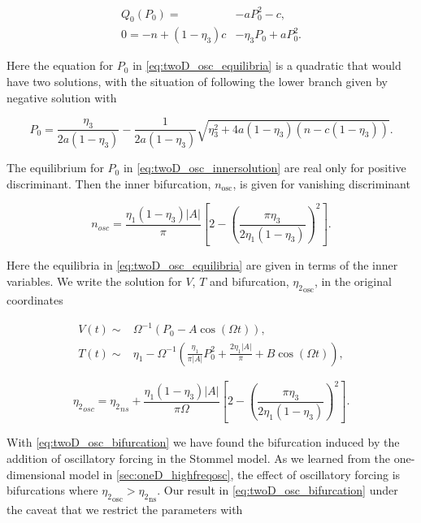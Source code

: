\begin{equation}\label{eq:twoD_osc_equilibria}
\begin{aligned}
Q_0(P_0)=&-aP_0^2-c,\\
0=-n+(1-\eta_3)c&-\eta_3 P_0+aP_0^2.
\end{aligned}
\end{equation}

Here the equation for $P_0$ in \eqref{eq:twoD_osc_equilibria} is a quadratic that would have two solutions, with the situation of following the lower branch given by negative solution with

\begin{equation}\label{eq:twoD_osc_innersolution}
P_0=\frac{\eta_3}{2a(1-\eta_3)}- \frac{1}{2a(1-\eta_3)}\sqrt{\eta_3^2+4a(1-\eta_3)(n-c(1-\eta_3))}.
\end{equation}

The equilibrium for $P_0$ in \eqref{eq:twoD_osc_innersolution} are real only for positive discriminant. Then the inner bifurcation, $n_{\text{osc}}$, is given for vanishing discriminant 

\begin{equation}\label{eq:twoD_osc_innerbif}
n_{osc} = \frac{\eta_1(1-\eta_3)|A|}{\pi}\left[2-\left(\frac{\pi\eta_3}{2\eta_1(1-\eta_3)}\right)^2\right].
\end{equation}

Here the equilibria in \eqref{eq:twoD_osc_equilibria} are given in terms of the inner variables. We write the solution for $V$, $T$ and bifurcation, ${\eta_2}_{\text{osc}}$, in the original coordinates

\begin{equation}\label{eq:twoD_osc_innersolnoriginal}
\begin{aligned}
V(t)\sim& \Omega^{-1}\left(P_0-A\cos(\Omega t)\right),\\
T(t)\sim& \eta_1-\Omega^{-1}\left(\frac{\eta_1}{\pi|A|}P_0^2+\frac{2\eta_1|A|}{\pi}+B\cos(\Omega t)\right),
\end{aligned}
\end{equation}

\begin{equation}\label{eq:twoD_osc_bifurcation}
{\eta_2}_{osc} = {\eta_2}_{ns}+\frac{\eta_1(1-\eta_3)|A|}{\pi\Omega}\left[2-\left(\frac{\pi\eta_3}{2\eta_1(1-\eta_3)}\right)^2\right].
\end{equation}

With \eqref{eq:twoD_osc_bifurcation} we have found the bifurcation induced by the addition of oscillatory forcing in the Stommel model. As we learned from the one-dimensional model in \autoref{sec:oneD_highfreqosc}, the effect of oscillatory forcing is bifurcations where ${\eta_2}_{\text{osc}}>{\eta_2}_{\text{ns}}$. Our result in \eqref{eq:twoD_osc_bifurcation} under the caveat that we restrict the parameters with 

